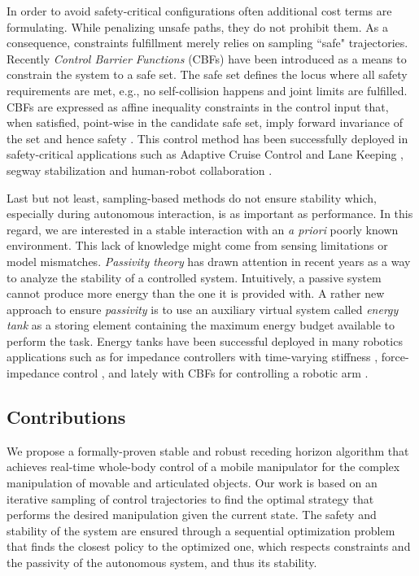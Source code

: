 In order to avoid safety-critical configurations often additional cost terms are formulating. While penalizing unsafe paths, they do not prohibit them. As a consequence, constraints fulfillment merely relies on sampling ``safe" trajectories. 
Recently \emph{Control Barrier Functions} (CBFs) have been introduced as a means to constrain the system to a safe set. The safe set defines the locus where all safety requirements are met, e.g., no self-collision happens and joint limits are fulfilled. CBFs are expressed as affine inequality constraints in the control input that, when satisfied, point-wise in the candidate safe set, imply forward invariance of the set and hence safety \cite{ames2016control}.  This control method has been successfully deployed in safety-critical applications such as Adaptive Cruise Control and Lane Keeping \cite{vahidi2003research}, segway stabilization \cite{gurriet2018towards} and human-robot collaboration \cite{benzi2021optimization}.

Last but not least, sampling-based methods do not ensure stability which, especially during autonomous interaction, is as important as performance. In this regard, we are interested in a stable interaction with an \emph{a priori} poorly known environment. This lack of knowledge might come from sensing limitations or model mismatches. \emph{Passivity theory} has drawn attention in recent years as a way to analyze the stability of a controlled system. Intuitively, a passive system cannot produce more energy than the one it is provided with. A rather new approach to ensure \emph{passivity} is to use an auxiliary virtual system called \emph{energy tank} as a storing element containing the maximum energy budget available to perform the task. Energy tanks have been successful deployed in many robotics applications such as for impedance controllers with time-varying stiffness \cite{schindlbeck2015unified}, force-impedance control \cite{shahriari2018valve}, and lately with CBFs for controlling a robotic arm \cite{benzi2021optimization}.

\subsection{Contributions}

We propose a formally-proven stable and robust receding horizon algorithm that achieves real-time whole-body control of a mobile manipulator for the complex manipulation of movable and articulated objects. Our work is based on an iterative sampling of control trajectories to find the optimal strategy that performs the desired manipulation given the current state. The safety and stability of the system are ensured through a sequential optimization problem that finds the closest policy to the optimized one, which respects constraints and the passivity of the autonomous system, and thus its stability. 

